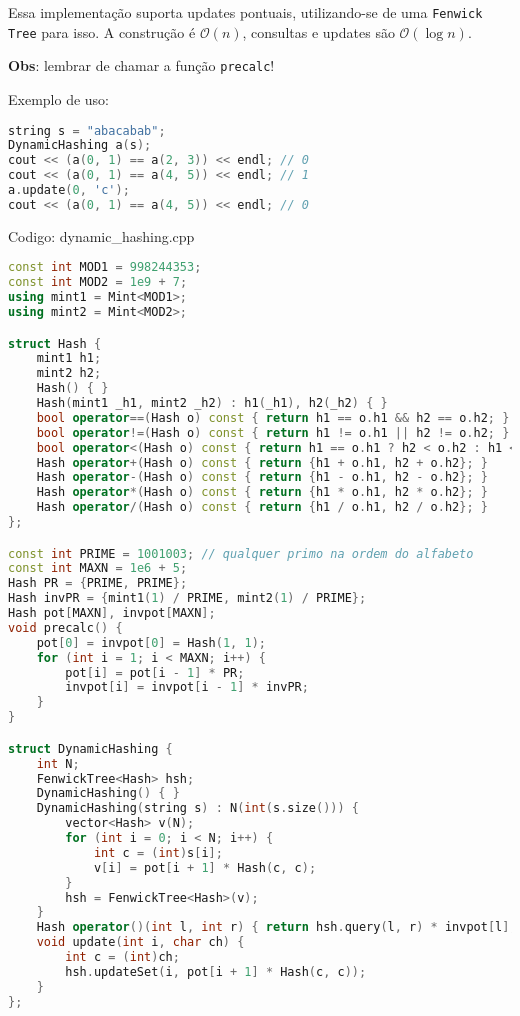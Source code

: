 \documentclass[10pt, a4paper, oneside]{book}
\begin{document}
Essa implementação suporta updates pontuais, utilizando-se de uma \texttt{Fenwick Tree} para isso. A construção é $\mathcal{O}(n)$, consultas e updates são $\mathcal{O}(\log n)$.



\textbf{Obs}: lembrar de chamar a função \texttt{precalc}!



Exemplo de uso:



\begin{lstlisting}[language=C++]
string s = "abacabab";
DynamicHashing a(s);
cout << (a(0, 1) == a(2, 3)) << endl; // 0
cout << (a(0, 1) == a(4, 5)) << endl; // 1
a.update(0, 'c');
cout << (a(0, 1) == a(4, 5)) << endl; // 0
\end{lstlisting}

\hfill

Codigo: dynamic\_hashing.cpp

\begin{lstlisting}[language=C++]
const int MOD1 = 998244353;
const int MOD2 = 1e9 + 7;
using mint1 = Mint<MOD1>;
using mint2 = Mint<MOD2>;

struct Hash {
    mint1 h1;
    mint2 h2;
    Hash() { }
    Hash(mint1 _h1, mint2 _h2) : h1(_h1), h2(_h2) { }
    bool operator==(Hash o) const { return h1 == o.h1 && h2 == o.h2; }
    bool operator!=(Hash o) const { return h1 != o.h1 || h2 != o.h2; }
    bool operator<(Hash o) const { return h1 == o.h1 ? h2 < o.h2 : h1 < o.h1; }
    Hash operator+(Hash o) const { return {h1 + o.h1, h2 + o.h2}; }
    Hash operator-(Hash o) const { return {h1 - o.h1, h2 - o.h2}; }
    Hash operator*(Hash o) const { return {h1 * o.h1, h2 * o.h2}; }
    Hash operator/(Hash o) const { return {h1 / o.h1, h2 / o.h2}; }
};

const int PRIME = 1001003; // qualquer primo na ordem do alfabeto
const int MAXN = 1e6 + 5;
Hash PR = {PRIME, PRIME};
Hash invPR = {mint1(1) / PRIME, mint2(1) / PRIME};
Hash pot[MAXN], invpot[MAXN];
void precalc() {
    pot[0] = invpot[0] = Hash(1, 1);
    for (int i = 1; i < MAXN; i++) {
        pot[i] = pot[i - 1] * PR;
        invpot[i] = invpot[i - 1] * invPR;
    }
}

struct DynamicHashing {
    int N;
    FenwickTree<Hash> hsh;
    DynamicHashing() { }
    DynamicHashing(string s) : N(int(s.size())) {
        vector<Hash> v(N);
        for (int i = 0; i < N; i++) {
            int c = (int)s[i];
            v[i] = pot[i + 1] * Hash(c, c);
        }
        hsh = FenwickTree<Hash>(v);
    }
    Hash operator()(int l, int r) { return hsh.query(l, r) * invpot[l]; }
    void update(int i, char ch) {
        int c = (int)ch;
        hsh.updateSet(i, pot[i + 1] * Hash(c, c));
    }
};
\end{lstlisting}
\hfill
\end{document}
